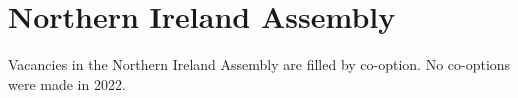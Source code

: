 \documentclass[a4paper,openany]{book}
\begin{document}
%
%

\section{Northern Ireland Assembly}

Vacancies in the Northern Ireland Assembly are filled by co-option.
No co-options were made in 2022.
%
\end{document}

